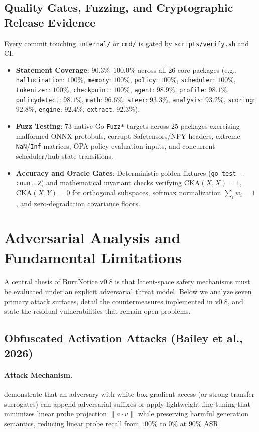 \documentclass{article}
\begin{document}
\subsection{Quality Gates, Fuzzing, and Cryptographic Release Evidence}
Every commit touching \texttt{internal/} or \texttt{cmd/} is gated by \texttt{scripts/verify.sh} and CI:
\begin{itemize}
    \item \textbf{Statement Coverage}: $90.3\%$--$100.0\%$ across all 26 core packages (e.g., \texttt{hallucination}: $100\%$, \texttt{memory}: $100\%$, \texttt{policy}: $100\%$, \texttt{scheduler}: $100\%$, \texttt{tokenizer}: $100\%$, \texttt{checkpoint}: $100\%$, \texttt{agent}: $98.9\%$, \texttt{profile}: $98.1\%$, \texttt{policydetect}: $98.1\%$, \texttt{math}: $96.6\%$, \texttt{steer}: $93.3\%$, \texttt{analysis}: $93.2\%$, \texttt{scoring}: $92.8\%$, \texttt{engine}: $92.4\%$, \texttt{extract}: $92.3\%$).
    \item \textbf{Fuzz Testing}: 73 native Go \texttt{Fuzz*} targets across 25 packages exercising malformed ONNX protobufs, corrupt Safetensors/NPY headers, extreme \texttt{NaN}/\texttt{Inf} matrices, OPA policy evaluation inputs, and concurrent scheduler/hub state transitions.
    \item \textbf{Accuracy and Oracle Gates}: Deterministic golden fixtures (\texttt{go test -count=2}) and mathematical invariant checks verifying $\text{CKA}(X,X)=1$, $\text{CKA}(X,Y)=0$ for orthogonal subspaces, softmax normalization $\sum_i w_i = 1$, and zero-degradation covariance floors.
\end{itemize}

\section{Adversarial Analysis and Fundamental Limitations}\label{sec:limitations}

A central thesis of BurnNotice v0.8 is that latent-space safety mechanisms must be evaluated under an explicit adversarial threat model. Below we analyze seven primary attack surfaces, detail the countermeasures implemented in v0.8, and state the residual vulnerabilities that remain open problems.

\subsection{Obfuscated Activation Attacks (Bailey et al., 2026)}
\paragraph{Attack Mechanism.}
\cite{bailey2026obfuscated} demonstrate that an adversary with white-box gradient access (or strong transfer surrogates) can append adversarial suffixes or apply lightweight fine-tuning that minimizes linear probe projection $\|a \cdot v\|$ while preserving harmful generation semantics, reducing linear probe recall from $100\%$ to $0\%$ at $90\%$ ASR.
\end{document}
